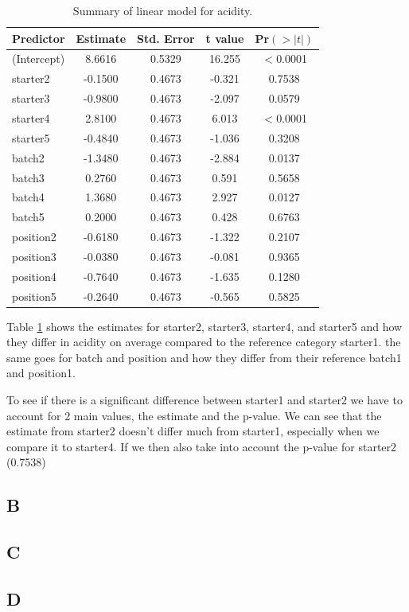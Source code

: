\documentclass{article}
\begin{document}
\begin{table}[H]
\centering
\begin{tabular}{lcccc}
\hline
\textbf{Predictor} & \textbf{Estimate} & \textbf{Std. Error} & \textbf{t value} & \textbf{Pr$(>|t|)$} \\
\hline
(Intercept) & 8.6616 & 0.5329 & 16.255 & $<$0.0001\\
starter2    & -0.1500 & 0.4673 & -0.321 & 0.7538    \\
starter3    & -0.9800 & 0.4673 & -2.097 & 0.0579  \\
starter4    & 2.8100 & 0.4673 & 6.013  & $<$0.0001\\
starter5    & -0.4840 & 0.4673 & -1.036 & 0.3208    \\
batch2      & -1.3480 & 0.4673 & -2.884 & 0.0137  \\
batch3      & 0.2760 & 0.4673 & 0.591  & 0.5658    \\
batch4      & 1.3680 & 0.4673 & 2.927  & 0.0127  \\
batch5      & 0.2000 & 0.4673 & 0.428  & 0.6763    \\
position2   & -0.6180 & 0.4673 & -1.322 & 0.2107    \\
position3   & -0.0380 & 0.4673 & -0.081 & 0.9365    \\
position4   & -0.7640 & 0.4673 & -1.635 & 0.1280    \\
position5   & -0.2640 & 0.4673 & -0.565 & 0.5825    \\
\hline
\end{tabular}
\caption{Summary of linear model for acidity.}
\label{table:acidity}
\end{table}

Table \ref{table:acidity} shows the estimates for starter2, starter3, starter4, and starter5 and how they differ in acidity on average compared to the reference category starter1. the same goes for batch and position and how they differ from their reference batch1 and position1. 

To see if there is a significant difference between starter1 and starter2 we have to account for 2 main values, the estimate and the p-value. We can see that the estimate from starter2 doesn't differ much from starter1, especially when we compare it to starter4. If we then also take into account the p-value for starter2 (0.7538) 



\subsection{B}



\subsection{C}

\subsection{D}




\end{document}
